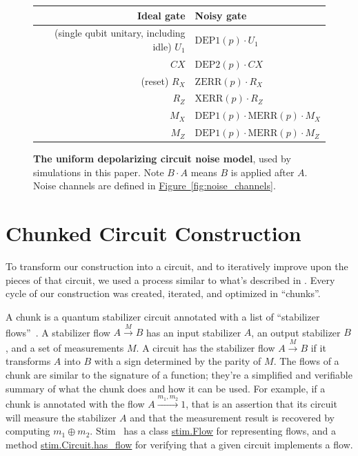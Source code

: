 \documentclass[onecolumn,unpublished,a4paper]{quantumarticle}
\theoremstyle{definition}
\newcommand{\fig}[1]{\hyperref[fig:#1]{Figure~\ref*{fig:#1}}}
\begin{document}
\begin{figure}[H]
    \centering
    \begin{tabular}{|r|l|}
    \hline
    Ideal gate & Noisy gate
    \\
    \hline
    (single qubit unitary, including idle) $U_1$ & $\text{DEP1}(p) \cdot U_1$
    \\
    $CX$ & $\text{DEP2}(p) \cdot CX$
    \\
    \hline
    (reset) $R_X$ & $\text{ZERR}(p) \cdot R_X$
    \\
    $R_Z$ & $\text{XERR}(p) \cdot R_Z$
    \\
    $M_X$ & $\text{DEP1}(p) \cdot \text{MERR}(p) \cdot M_X$
    \\
    $M_Z$ & $\text{DEP1}(p) \cdot \text{MERR}(p) \cdot M_Z$
    \\
    \hline
    \end{tabular}
    \caption{
        \textbf{The uniform depolarizing circuit noise model}, used by simulations in this paper.
        Note $B \cdot A$ means $B$ is applied after $A$.
        Noise channels are defined in \fig{noise_channels}.
    }
    \label{fig:noise_model}
\end{figure}

\clearpage
\section{Chunked Circuit Construction}
\label{app:chunk}

To transform our construction into a circuit, and to iteratively improve upon the pieces of that circuit, we used a process similar to what's described in \cite{gidney2024ybasis}.
Every cycle of our construction was created, iterated, and optimized in ``chunks''.

A chunk is a quantum stabilizer circuit annotated with a list of ``stabilizer flows''~\cite{mcewenmidoutsurfaces2023}.
A stabilizer flow $A \xrightarrow{M} B$ has an input stabilizer $A$, an output stabilizer $B$, and a set of measurements $M$.
A circuit has the stabilizer flow $A \xrightarrow{M} B$ if it transforms $A$ into $B$ with a sign determined by the parity of $M$.
The flows of a chunk are similar to the signature of a function; they're a simplified and verifiable summary of what the chunk does and how it can be used.
For example, if a chunk is annotated with the flow $A \xrightarrow{m_1,m_2} 1$, that is an assertion that its circuit will measure the stabilizer $A$ and that the measurement result is recovered by computing $m_1 \oplus m_2$.
Stim~\cite{gidney2021stim} has a class \href{https://github.com/quantumlib/Stim/blob/main/doc/python_api_reference_vDev.md#stim.Flow}{stim.Flow} for representing flows, and a method \href{https://github.com/quantumlib/Stim/blob/main/doc/python_api_reference_vDev.md#stim.Circuit.has_flow}{stim.Circuit.has\_flow} for verifying that a given circuit implements a flow.
\end{document}

